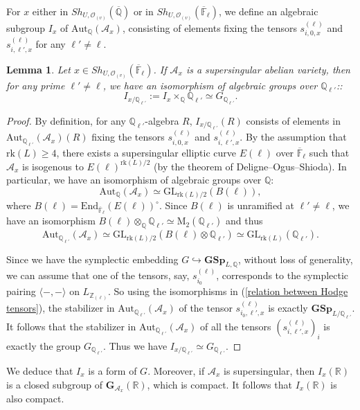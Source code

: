 \documentclass[11pt,oneside,reqno]{amsart}
\newcommand{\bfGSp}{\mathbf{GSp}}
\newcommand{\GL}{\mathrm{GL}}
\newcommand{\Aut}{\mathrm{Aut}}
\newcommand{\End}{\mathrm{End}}
\newcommand{\F}{\mathbb{F}}
\newcommand{\Q}{\mathbb{Q}}
\newcommand{\R}{\mathbb{R}}
\newcommand{\Z}{\mathbb{Z}}
\newcommand{\Acal}{\mathcal{A}}
\newcommand{\Ocal}{\mathcal{O}}
\newcommand{\Gbf}{\mathbf{G}}
\theoremstyle{plain}
\newtheorem{lemma}[theorem]{Lemma}
\begin{document}
	
	
	
	
	For $x$ either in $Sh_{U,\Ocal_{(v)}}(\overline{\Q})$ or in $Sh_{U,\Ocal_{(v)}}(\overline{\F}_\ell)$, we define an algebraic subgroup $I_x$ of $\Aut_\Q(\Acal_x)$, consisting of elements fixing the tensors $s^{(\ell)}_{i,0,x}$ and $s^{(\ell)}_{i,\ell',x}$ for any $\ell'\neq\ell$.
	
	
	\begin{lemma}\label{I_x(Q_p)=G(Q_p) for supersingular}
		Let $x\in Sh_{U,\Ocal_{(v)}}(\overline{\F}_\ell)$. If $\Acal_x$ is a supersingular abelian variety, then for any prime $\ell'\neq\ell$, we have an isomorphism of algebraic groups over $\Q_{\ell'}$::
		\[
		I_{x/\Q_{\ell'}}:=I_x\times_\Q\Q_{\ell'}\simeq G_{\Q_{\ell'}}.
		\]
	\end{lemma}
	\begin{proof}
		By definition, for any $\Q_{\ell'}$-algebra $R$, $I_{x/\Q_{\ell'}}(R)$ consists of elements in $\Aut_{\Q_{\ell'}}(\Acal_x)(R)$ fixing the tensors $s^{(\ell)}_{i,0,x}$ and $s^{(\ell)}_{i,\ell',x}$. By the assumption that $\mathrm{rk}(L)\ge4$, there exists a supersingular elliptic curve $E(\ell)$ over $\overline{\F}_\ell$ such that $\Acal_x$ is isogenous to $E(\ell)^{\mathrm{rk}(L)/2}$ (by the theorem of Deligne--Ogus--Shioda). In particular, we have an isomorphism of algebraic groups over $\Q$:
		\[
		\Aut_\Q(\Acal_x)
		\simeq
		\GL_{\mathrm{rk}(L)/2}(B(\ell)),
		\]
		where $B(\ell)=\End_{\overline{\F}_\ell}(E(\ell))^\circ$. Since $B(\ell)$ is unramified at $\ell'\neq\ell$, we have an isomorphism $B(\ell)\otimes_\Q\Q_{\ell'}\simeq\mathrm{M}_2(\Q_{\ell'})$ and thus
		\[
		\Aut_{\Q_{\ell'}}(\Acal_x)
		\simeq
		\GL_{\mathrm{rk}(L)/2}(B(\ell)\otimes\Q_{\ell'})
		\simeq
		\GL_{\mathrm{rk}(L)}(\Q_{\ell'}).
		\]
		
		
		
		Since we have the symplectic embedding $G\hookrightarrow\bfGSp_{L,\Q}$, without loss of generality, we can assume that one of the tensors, say, $s^{(\ell)}_{i_0}$, corresponds to the symplectic pairing $\langle-,-\rangle$ on $L_{\Z_{(\ell)}}$. So using the isomorphisms in (\ref{relation between Hodge tensors}), the stabilizer in $\Aut_{\Q_{\ell'}}(\Acal_x)$ of the tensor $s^{(\ell)}_{i_0,\ell',x}$ is exactly $\bfGSp_{L/\Q_{\ell'}}$. It follows that the stabilizer in $\Aut_{\Q_{\ell'}}(\Acal_x)$ of all the tensors $(s^{(\ell)}_{i,\ell',x})_i$ is exactly the group $G_{\Q_{\ell'}}$. Thus we have $I_{x/\Q_{\ell'}}\simeq G_{\Q_{\ell'}}$.
	\end{proof}
	We deduce that $I_x$ is a form of $G$. Moreover, if $\Acal_x$ is supersingular, then $I_x(\R)$ is a closed subgroup of $\Gbf_{\Acal_x}(\R)$, which is compact. It follows that $I_x(\R)$ is also compact.
	
\end{document}

